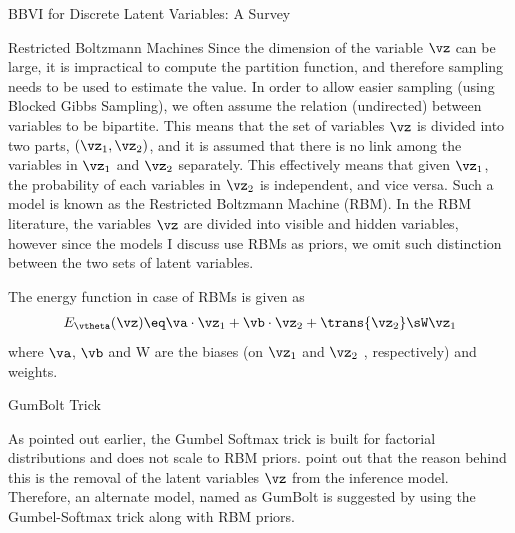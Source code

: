 \documentclass{article}
\begin{document}
\begin{psection}{BBVI for Discrete Latent Variables: A Survey}
\begin{psubsection}{Restricted Boltzmann Machines}
		Since the dimension of the variable $\vz$ can be large, it is impractical to compute the partition function, and therefore sampling needs to be used to estimate the value. In order to allow easier sampling (using Blocked Gibbs Sampling), we often assume the relation (undirected) between variables to be bipartite. This means that the set of variables $\vz$ is divided into two parts, $(\vz_1, \vz_2)$, and it is assumed that there is no link among the variables in $\vz_1$ and $\vz_2$ separately. This effectively means that given $\vz_1$, the probability of each variables in $\vz_2$ is independent, and vice versa. Such a model is known as the Restricted Boltzmann Machine (RBM). In the RBM literature, the variables $\vz$ are divided into visible and hidden variables, however since the models I discuss use RBMs as priors, we omit such distinction between the two sets of latent variables.

		The energy function in case of RBMs is given as
		\begin{align}
			E_\vtheta(\vz) \eq \va \cdot \vz_1 + \vb \cdot \vz_2 + \trans{\vz_2} \sW \vz_1
			\label{eq:energy-function}
		\end{align}
		where $\va$, $\vb$ and W are the biases (on $\vz_1$ and $\vz_2$ , respectively) and weights.

	\end{psubsection}

	\begin{psubsection}{GumBolt Trick}

		As pointed out earlier, the Gumbel Softmax trick is built for factorial distributions and does not scale to RBM priors. \cite{gumbolt} point out that the reason behind this is the removal of the latent variables $\vz$ from the inference model. Therefore, an alternate model, named as GumBolt is suggested by \cite{gumbolt} using the Gumbel-Softmax trick along with RBM priors.


\end{psubsection}
\end{psection}
\end{document}
